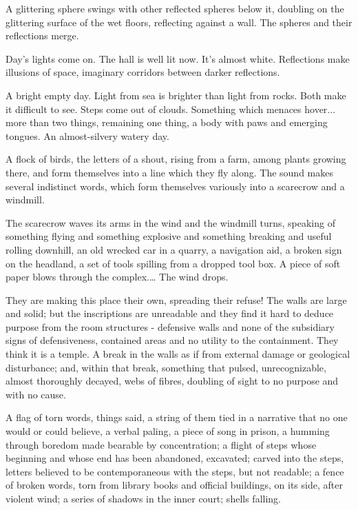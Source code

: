 \documentclass[
]{memoir}
\newlength{\drop}%
\begin{document}
A glittering sphere swings with other reflected spheres below it,
doubling on the glittering surface of the wet floors, reflecting against
a wall. The spheres and their reflections merge.

Day's lights come on. The hall is well lit now. It's almost white.
Reflections make illusions of space, imaginary corridors between darker
reflections.

A bright empty day. Light from sea is brighter than light from rocks.
Both make it difficult to see. Steps come out of clouds. Something which
menaces hover... more than two things, remaining one thing, a body with
paws and emerging tongues. An almost-silvery watery day.

A flock of birds, the letters of a shout, rising from a farm, among
plants growing there, and form themselves into a line which they fly
along. The sound makes several indistinct words, which form themselves
variously into a scarecrow and a windmill.

The scarecrow waves its arms in the wind and the windmill turns,
speaking of something flying and something explosive and something
breaking and useful rolling downhill, an old wrecked car in a quarry, a
navigation aid, a broken sign on the headland, a set of tools spilling
from a dropped tool box. A piece of soft paper blows through the
complex.\ldots{} The wind drops.

They are making this place their own, spreading their refuse! The walls
are large and solid; but the inscriptions are unreadable and they find
it hard to deduce purpose from the room structures - defensive walls and
none of the subsidiary signs of defensiveness, contained areas and no
utility to the containment. They think it is a temple. A break in the
walls as if from external damage or geological disturbance; and, within
that break, something that pulsed, unrecognizable, almost thoroughly
decayed, webs of fibres, doubling of sight to no purpose and with no
cause.

A flag of torn words, things said, a string of them tied in a narrative
that no one would or could believe, a verbal paling, a piece of song in
prison, a humming through boredom made bearable by concentration; a
flight of steps whose beginning and whose end has been abandoned,
excavated; carved into the steps, letters believed to be contemporaneous
with the steps, but not readable; a fence of broken words, torn from
library books and official buildings, on its side, after violent wind; a
series of shadows in the inner court; shells falling.
\end{document}

